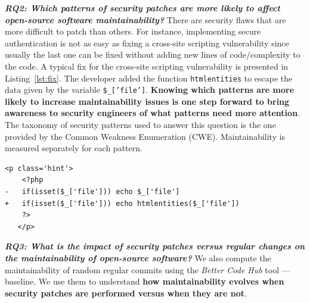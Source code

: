 \documentclass[10pt,conference]{IEEEtran}
\newcounter{lstannotation}
\begin{document}
\textit{\textbf{RQ2: Which patterns of security patches are more likely to
affect open-source software maintainability?}}
There are security flaws that are more difficult to patch than others. For
instance, implementing secure authentication is not as easy as fixing a
cross-site scripting vulnerability since usually the last one can be fixed
without adding new lines of code/complexity to the code. A typical fix for 
the cross-site scripting vulnerability is presented in Listing~\ref{lst:fix}. 
The developer added the function \texttt{htmlentities} to escape the data given by the variable
\texttt{\$\_['file']}. \textbf{Knowing which patterns are more likely to increase
maintainability issues is one step forward to bring awareness to security
engineers of what patterns need more attention}. The taxonomy of security
patterns used to answer this question is the one provided by the Common Weakness Enumeration
(CWE). Maintainability is measured
separately for each pattern.
%
\setcounter{lstannotation}{0}
\begin{lstlisting}[style={PHPStyle}, caption={Fix provided by \texttt{nextcloud/server} developers to a \\Cross-Site Scripting vulnerability},label={lst:fix}]
   <p class='hint'>
    <?php
-   if(isset($_['file'])) echo $_['file']
+   if(isset($_['file'])) echo htmlentities($_['file'])
    ?>
   </p>
\end{lstlisting}
%
\textit{\textbf{RQ3: What is the impact of security patches versus regular changes on the
maintainability of open-source software?}}
%
We also compute the maintainability of random regular commits using the
\emph{Better Code Hub} tool --- baseline.  We use them to understand \textbf{how
maintainability evolves when security patches are performed versus when
they are not}.
%
\end{document}
